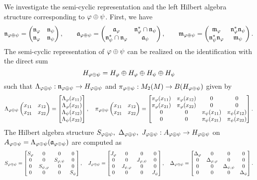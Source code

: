 \documentclass{../../small}
\begin{document}
\begin{pf}
We investigate the semi-cyclic representation and the left Hilbert algebra structure corresponding to $\f\oplus\psi$.
First, we have
\[\fn_{\f\oplus\psi}=\mat{\fn_\f&\fn_\psi\\\fn_\f&\fn_\psi},\qquad
\fa_{\f\oplus\psi}=\mat{\fa_\f&\fn_\f^*\cap\fn_\psi\\\fn_\psi^*\cap\fn_\f&\fa_\psi},\qquad
\fm_{\f\oplus\psi}=\mat{\fm_\f&\fn_\f^*\fn_\psi\\\fn_\psi^*\fn_\f&\fm_\psi}.
\]
The semi-cyclic representation of $\f\oplus\psi$ can be realized on the identification with the direct sum
\[H_{\f\oplus\psi}=H_\f\oplus H_\f\oplus H_\psi\oplus H_\psi\]
such that $\Lambda_{\f\oplus\psi}:\fn_{\f\oplus\psi}\to H_{\f\oplus\psi}$ and $\pi_{\f\oplus\psi}:M_2(M)\to B(H_{\f\oplus\psi})$ given by
\[\Lambda_{\f\oplus\psi}\mat{x_{11}&x_{12}\\x_{21}&x_{22}}=\mat[b]{\Lambda_\f(x_{11})\\\Lambda_\f(x_{21})\\\Lambda_\psi(x_{12})\\\Lambda_\psi(x_{22})},\quad
\pi_{\f\oplus\psi}\mat{x_{11}&x_{12}\\x_{21}&x_{22}}=\mat[b]{
\pi_\f(x_{11})&\pi_\f(x_{12})&0&0\\
\pi_\f(x_{21})&\pi_\f(x_{22})&0&0\\
0&0&\pi_\psi(x_{11})&\pi_\psi(x_{12})\\
0&0&\pi_\psi(x_{21})&\pi_\psi(x_{22})}.\]
The Hilbert algebra structure $S_{\f\oplus\psi},\ \Delta_{\f\oplus\psi},\ J_{\f\oplus\psi}:A_{\f\oplus\psi}\to H_{\f\oplus\psi}$ on $A_{\f\oplus\psi}=\Lambda_{\f\oplus\psi}(\fa_{\f\oplus\psi})$ are computed as
\[S_{\f\oplus\psi}=\mat[b]{
S_\f&0&0&0\\
0&0&S_{\f,\psi}&0\\
0&S_{\psi,\f}&0&0\\
0&0&0&S_\psi},\quad
J_{\f\oplus\psi}=\mat[b]{
J_\f&0&0&0\\
0&0&J_{\f,\psi}&0\\
0&J_{\psi,\f}&0&0\\
0&0&0&J_\psi},\quad
\Delta_{\f\oplus\psi}=\mat[b]{
\Delta_\f&0&0&0\\
0&\Delta_{\f,\f}&0&0\\
0&0&\Delta_{\psi,\psi}&0\\
0&0&0&\Delta_\psi}.\]





\end{pf}
\end{document}
